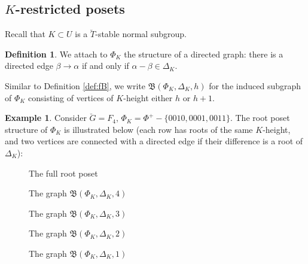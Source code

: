 \documentclass[11pt]{amsart}
\theoremstyle{definition}
\newtheorem{defn}[thm]{Definition}
\newtheorem{example}[thm]{Example}
\newcommand{\fB}{\mathfrak{B}}
\newcommand{\bG}{\breve{G}}
\newcommand{\bT}{\breve{T}}
\begin{document}

\subsection{$K$-restricted posets}

Recall that $K\subset U$
is a $\bT$-stable normal subgroup.

\begin{defn}
We attach to $\Phi_K$
the structure of a directed graph:
there is a directed edge
$\beta\to \alpha$
if and only if
$\alpha-\beta\in \Delta_K$.

Similar to  Definition \ref{def:fB},
we write
$\fB(\Phi_K, \Delta_K, h)$
for the induced subgraph of $\Phi_K$
consisting of vertices of $K$-height
either $h$ or $h+1$.
\end{defn}

\begin{example}
Consider $\bG=F_4$, $\Phi_K=\Phi^+-\{0010, 0001, 0011\}$.
The root poset structure of $\Phi_K$
is illustrated below
(each row has roots of the same $K$-height,
and two vertices are connected with a directed edge
if their difference is a root of $\Delta_K$):

\begin{figure}[H]
\scriptsize
\scalebox{.7}{
\FKfull
}
\caption{The full root poset}
\label{figure:F4-K-example}
\end{figure}

\begin{figure}[H]
\scriptsize
\scalebox{.7}{\FKfour}
\caption{The graph $\fB(\Phi_K, \Delta_K, 4)$}
\end{figure}

\begin{figure}[H]
\scriptsize
\scalebox{.7}{\FKthree}
\caption{The graph $\fB(\Phi_K, \Delta_K, 3)$}
\end{figure}

\begin{figure}[H]
\scriptsize
\scalebox{.7}{\FKtwo}
\caption{The graph $\fB(\Phi_K, \Delta_K, 2)$}
\label{figure:F4-K-example-2}
\end{figure}

\begin{figure}[H]
\scriptsize
\scalebox{.7}{\FKone}
\caption{The graph $\fB(\Phi_K, \Delta_K, 1)$}
\end{figure}
\end{example}
\end{document}

